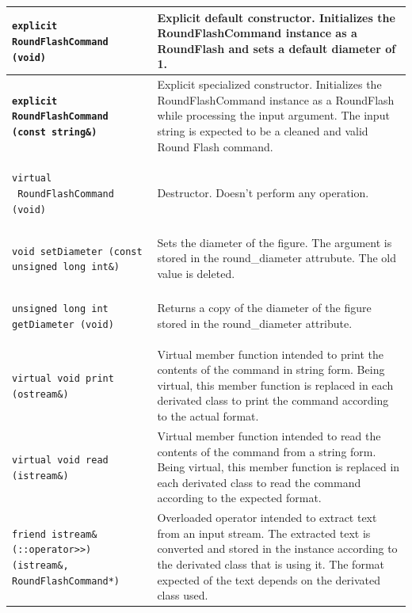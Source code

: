 \documentclass[11pt,twoside,openany,x11names,svgnames]{memoir}
\begin{document}
\begin{table}[h]\footnotesize
\centering
\begin{tabular}{| >{\bfseries}p{7.5cm} | p{8cm} |}
	\hline
	
	\texttt{explicit RoundFlashCommand (void)} & Explicit default constructor. Initializes the RoundFlashCommand instance as a RoundFlash and sets a default diameter of 1. \\
	
	\hline
	
	\texttt{explicit RoundFlashCommand (const string\&)} & Explicit specialized constructor. Initializes the RoundFlashCommand instance as a RoundFlash while processing the input argument. The input string is expected to be a cleaned and valid Round Flash command. \\
	
	\hline
	
	\texttt{virtual ~RoundFlashCommand (void)} & Destructor. Doesn't perform any operation. \\
	
	\hline
	
	\texttt{void setDiameter (const unsigned long int\&)} & Sets the diameter of the figure. The argument is stored in the round\_diameter attrubute. The old value is deleted. \\
	
	\hline	
	
	\texttt{unsigned long int getDiameter (void)} & Returns a copy of the diameter of the figure stored in the round\_diameter attribute. \\
		
	\hline
	
	\texttt{virtual void print (ostream\&)} & Virtual member function intended to print the contents of the command in string form. Being virtual, this member function is replaced in each derivated class to print the command according to the actual format. \\
	
	\hline
	
	\texttt{virtual void read (istream\&)} & Virtual member function intended to read the contents of the command from a string form. Being virtual, this member function is replaced in each derivated class to read the command according to the expected format. \\
	
	\hline	
		
	\texttt{friend istream\& (::operator>>) (istream\&, RoundFlashCommand*)} & Overloaded operator intended to extract text from an input stream. The extracted text is converted and stored in the instance according to the derivated class that is using it. The format expected of the text depends on the derivated class used. \\
	

\end{tabular}
\end{table}
\end{document}
